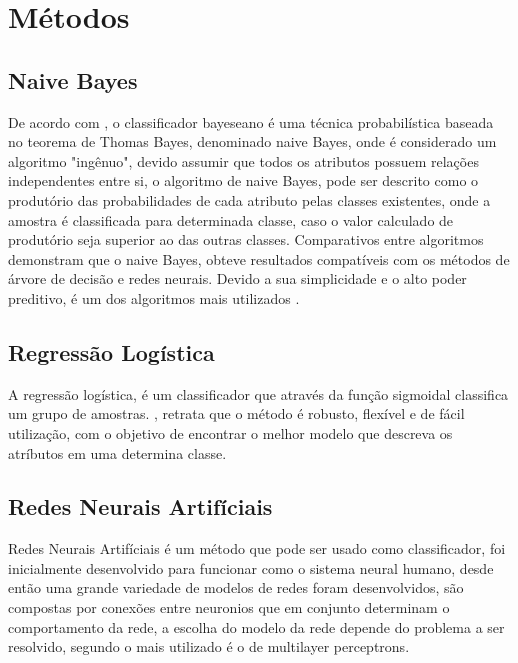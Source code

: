 \documentclass[10pt, conference, compsocconf]{IEEEtran}
\begin{document}
\section{Métodos}\label{metodos}
\subsection{Naive Bayes}
De acordo com \cite{4}, o classificador bayeseano é uma técnica probabilística baseada no teorema de Thomas Bayes, denominado naive Bayes, onde é considerado um algoritmo "ingênuo", devido assumir que todos os atributos possuem relações independentes entre si, o algoritmo de naive Bayes, pode ser descrito como o produtório das probabilidades de cada atributo pelas classes existentes, onde a amostra é classificada para determinada classe, caso o valor calculado de produtório seja superior ao das outras classes. Comparativos entre algoritmos demonstram que o naive Bayes, obteve resultados compatíveis com os métodos de árvore de decisão e redes neurais. Devido a sua simplicidade e o alto poder preditivo, é um dos algoritmos mais utilizados \cite{5}.
 
\subsection{Regressão Logística}
A regressão logística, é um classificador que através da função sigmoidal classifica um grupo de amostras. \cite{6}, retrata que o método é robusto, flexível e de fácil utilização, com o objetivo de encontrar o melhor modelo que descreva os atríbutos em uma determina classe.

\subsection{Redes Neurais Artifíciais}
Redes Neurais Artifíciais é um método que pode ser usado como classificador, foi inicialmente desenvolvido para funcionar como o sistema neural humano, desde então uma grande variedade de modelos de redes foram desenvolvidos, são compostas por conexões entre neuronios que em conjunto determinam o comportamento da rede, a escolha do modelo da rede depende do problema a ser resolvido, segundo \cite{7} o mais utilizado é o de multilayer perceptrons.
\end{document}

